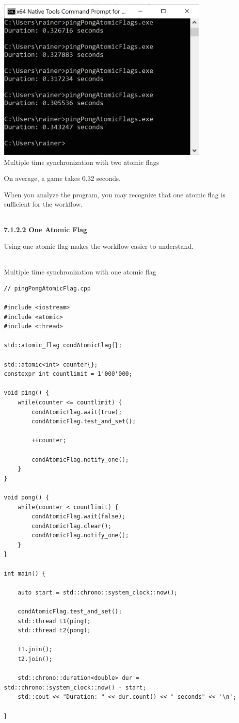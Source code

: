\begin{center}
\includegraphics[width=0.8\textwidth]{content/3/chapter7/images/3.png}\\
Multiple time synchronization with two atomic flags
\end{center}

On average, a game takes 0.32 seconds.

When you analyze the program, you may recognize that one atomic flag is sufficient for the workflow.

\hspace*{\fill} \\ %
\noindent
\textbf{7.1.2.2\hspace{0.2cm} One Atomic Flag}

Using one atomic flag makes the workflow easier to understand.

\hspace*{\fill} \\ %
\noindent
Multiple time synchronization with one atomic flag
\begin{lstlisting}[style=styleCXX]
// pingPongAtomicFlag.cpp

#include <iostream>
#include <atomic>
#include <thread>

std::atomic_flag condAtomicFlag{};

std::atomic<int> counter{};
constexpr int countlimit = 1'000'000;

void ping() {
	while(counter <= countlimit) {
		condAtomicFlag.wait(true);
		condAtomicFlag.test_and_set();
		
		++counter;
		
		condAtomicFlag.notify_one();
	}
}

void pong() {
	while(counter < countlimit) {
		condAtomicFlag.wait(false);
		condAtomicFlag.clear();
		condAtomicFlag.notify_one();
	}
}

int main() {

	auto start = std::chrono::system_clock::now();
	
	condAtomicFlag.test_and_set();
	std::thread t1(ping);
	std::thread t2(pong);
	
	t1.join();
	t2.join();
	
	std::chrono::duration<double> dur = std::chrono::system_clock::now() - start;
	std::cout << "Duration: " << dur.count() << " seconds" << '\n';

}
\end{lstlisting}

